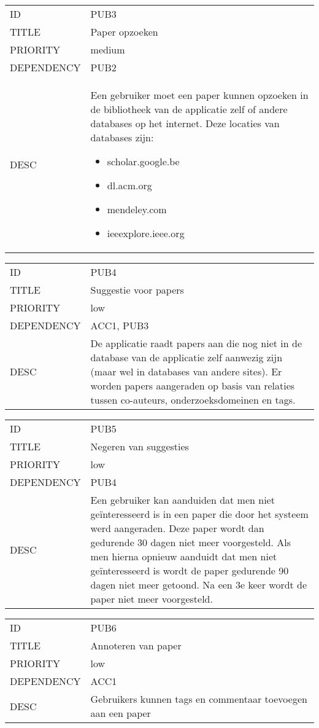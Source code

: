 \begin{longtable}{lp{10cm}}
ID           & PUB3\\
TITLE        & Paper opzoeken\\
PRIORITY     & medium\\
DEPENDENCY   & PUB2\\
DESC         & Een gebruiker moet een paper kunnen opzoeken in de bibliotheek van de applicatie zelf of andere databases op het internet. Deze locaties van databases zijn:
\begin{itemize}
\item scholar.google.be
\item dl.acm.org
\item mendeley.com
\item ieeexplore.ieee.org
\end{itemize}     
\end{longtable}

\begin{longtable}{lp{10cm}}
ID           & PUB4\\
TITLE        & Suggestie voor papers\\
PRIORITY     & low\\
DEPENDENCY   & ACC1, PUB3\\
DESC         &  De applicatie raadt papers aan die nog niet in de database van de applicatie zelf aanwezig zijn (maar wel in databases van andere sites). Er worden papers aangeraden op basis van relaties tussen co-auteurs, onderzoeksdomeinen en tags.     
\end{longtable}

\begin{longtable}{lp{10cm}}
ID           & PUB5\\
TITLE        & Negeren van suggesties\\
PRIORITY     & low\\
DEPENDENCY   & PUB4\\
DESC         & Een gebruiker kan aanduiden dat men niet geïnteresseerd is in een paper die door het systeem werd aangeraden. Deze paper wordt dan gedurende 30 dagen niet meer voorgesteld. Als men hierna opnieuw aanduidt dat men niet geïnteresseerd is wordt de paper gedurende 90 dagen niet meer getoond. Na een 3e keer wordt de paper niet meer voorgesteld.     
\end{longtable}

\begin{longtable}{lp{10cm}}
ID           & PUB6\\
TITLE        & Annoteren van paper\\
PRIORITY     & low\\
DEPENDENCY   & ACC1\\
DESC         & Gebruikers kunnen tags en commentaar toevoegen aan een paper     
\end{longtable}

